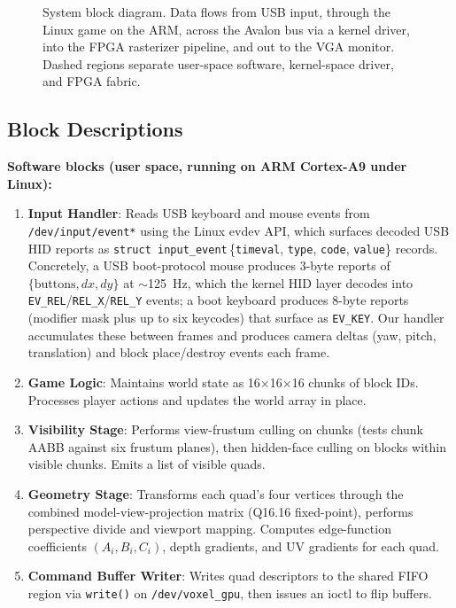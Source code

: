 \documentclass[11pt]{article}
\begin{document}
\begin{figure}[!htbp]
\caption{System block diagram. Data flows from USB input, through the Linux game on the ARM, across the Avalon bus via a kernel driver, into the FPGA rasterizer pipeline, and out to the VGA monitor. Dashed regions separate user-space software, kernel-space driver, and FPGA fabric.}
\label{fig:blockdiagram}
\end{figure}

\subsection{Block Descriptions}

\textbf{Software blocks (user space, running on ARM Cortex-A9 under Linux):}

\begin{enumerate}
\item \textbf{Input Handler}: Reads USB keyboard and mouse events from \texttt{/dev/input/event*} using the Linux evdev API, which surfaces decoded USB HID reports as \texttt{struct input\_event}\,\{\texttt{timeval}, \texttt{type}, \texttt{code}, \texttt{value}\} records. Concretely, a USB boot-protocol mouse produces 3-byte reports of $\{\text{buttons}, dx, dy\}$ at $\sim$125~Hz, which the kernel HID layer decodes into \texttt{EV\_REL}/\texttt{REL\_X}/\texttt{REL\_Y} events; a boot keyboard produces 8-byte reports (modifier mask plus up to six keycodes) that surface as \texttt{EV\_KEY}. Our handler accumulates these between frames and produces camera deltas (yaw, pitch, translation) and block place/destroy events each frame.

\item \textbf{Game Logic}: Maintains world state as 16$\times$16$\times$16 chunks of block IDs. Processes player actions and updates the world array in place.

\item \textbf{Visibility Stage}: Performs view-frustum culling on chunks (tests chunk AABB against six frustum planes), then hidden-face culling on blocks within visible chunks. Emits a list of visible quads.

\item \textbf{Geometry Stage}: Transforms each quad's four vertices through the combined model-view-projection matrix (Q16.16 fixed-point), performs perspective divide and viewport mapping. Computes edge-function coefficients $(A_i, B_i, C_i)$, depth gradients, and UV gradients for each quad.

\item \textbf{Command Buffer Writer}: Writes quad descriptors to the shared FIFO region via \texttt{write()} on \texttt{/dev/voxel\_gpu}, then issues an ioctl to flip buffers.
\end{enumerate}
\end{document}
